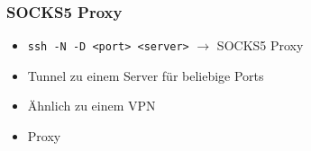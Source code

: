 \begin{frame}
	\frametitle{SOCKS5 Proxy}
	\begin{itemize}
		\item \texttt{ssh -N -D <port> <server>} $\rightarrow$ SOCKS5 Proxy
		\item Tunnel zu einem Server für beliebige Ports
		\item Ähnlich zu einem VPN
		\item Proxy
	\end{itemize}
\end{frame}